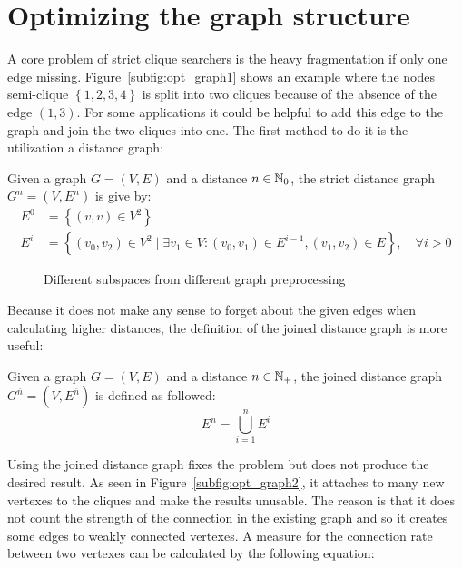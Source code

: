 \section{Optimizing the graph structure}
A core problem of strict clique searchers is the heavy fragmentation if only one edge missing. Figure~\ref{subfig:opt_graph1} shows an example where the nodes semi-clique $\left\{1,2,3,4\right\}$ is split into two cliques because of the absence of the edge $(1,3)$. For some applications it could be helpful to add this edge to the graph and join the two cliques into one. The first method to do it is the utilization a distance graph:
\begin{envdef}
	Given a graph $G=(V,E)$ and a distance $n \in \mathbb{N}_0$, the strict distance graph $G^n=(V,E^n)$ is give by:
	\begin{align}
		E^0 &= \left\{ (v,v) \in V^2 \right\}\\
		E^i &= \left\{ (v_0,v_2) \in V^2 \mid \exists v_1 \in V : (v_0,v_1) \in E^{i-1}, (v_1,v_2) \in E \right\}, \quad \forall i>0
	\end{align}
\end{envdef}
\begin{figure}
	\caption{Different subspaces from different graph preprocessing}
	\label{fig:opt_graph}
	\centering
	\hfill
	\hfill
	\subfloat[\label{subfig:opt_graph3}Filtered distance with $\alpha=\frac23$]{}
	\hfill
	\subfloat[\label{subfig:opt_graph4}Bidirectional filtered distance with $\alpha=\frac23$]{}
\end{figure}
Because it does not make any sense to forget about the given edges when calculating higher distances, the definition of the joined distance graph is more useful:
\begin{envdef}
	Given a graph $G=(V,E)$ and a distance $n \in \mathbb{N}_+$, the joined distance graph $G^{\overline{n}}=(V,E^{\overline{n}})$ is defined as followed:
	\begin{equation}
		E^{\overline{n}} = \bigcup_{i=1}^n E^i
	\end{equation}
\end{envdef}
Using the joined distance graph fixes the problem but does not produce the desired result. As seen in Figure~\ref{subfig:opt_graph2}, it attaches to many new vertexes to the cliques and make the results unusable. The reason is that it does not count the strength of the connection in the existing graph and so it creates some edges to weakly connected vertexes. A measure for the connection rate between two vertexes can be calculated by the following equation:
